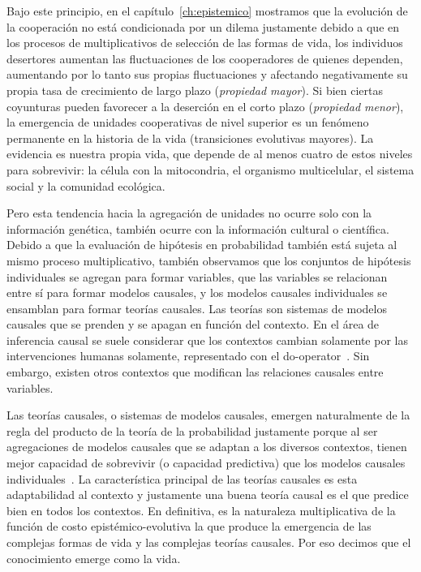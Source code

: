 \documentclass[a4paper,11pt]{book}
\theoremstyle{definition}
\begin{document}

Bajo este principio, en el cap\'itulo~\ref{ch:epistemico} mostramos que la evoluci\'on de la cooperaci\'on no est\'a condicionada por un dilema justamente debido a que en los procesos de multiplicativos de selecci\'on de las formas de vida, los individuos desertores aumentan las fluctuaciones de los cooperadores de quienes dependen, aumentando por lo tanto sus propias fluctuaciones y afectando negativamente su propia tasa de crecimiento de largo plazo (\emph{propiedad mayor}).
%
Si bien ciertas coyunturas pueden favorecer a la deserci\'on en el corto plazo (\emph{propiedad menor}), la emergencia de unidades cooperativas de nivel superior es un fen\'omeno permanente en la historia de la vida (transiciones evolutivas mayores).
%
La evidencia es nuestra propia vida, que depende de al menos cuatro de estos niveles para sobrevivir: la c\'elula con la mitocondria, el organismo multicelular, el sistema social y la comunidad ecol\'ogica.


Pero esta tendencia hacia la agregaci\'on de unidades no ocurre solo con la informaci\'on gen\'etica, tambi\'en ocurre con la informaci\'on cultural o cient\'ifica.
%
Debido a que la evaluaci\'on de hip\'otesis en probabilidad tambi\'en est\'a sujeta al mismo proceso multiplicativo, tambi\'en observamos que los conjuntos de hip\'otesis individuales se agregan para formar variables, que las variables se relacionan entre s\'i para formar modelos causales, y los modelos causales individuales se ensamblan para formar teor\'ias causales.
%
Las teor\'ias son sistemas de modelos causales que se prenden y se apagan en funci\'on del contexto.
%
En el \'area de inferencia causal se suele considerar que los contextos cambian solamente por las intervenciones humanas solamente, representado con el do-operator~\cite{pearl2009-causality}.
%
Sin embargo, existen otros contextos que modifican las relaciones causales entre variables.


Las teor\'ias causales, o sistemas de modelos causales, emergen naturalmente de la regla del producto de la teor\'ia de la probabilidad justamente porque al ser agregaciones de modelos causales que se adaptan a los diversos contextos, tienen mejor capacidad de sobrevivir (o capacidad predictiva) que los modelos causales individuales~\cite{winn2012-causality,minka2008-gates}.
%
La caracter\'istica principal de las teor\'ias causales es esta adaptabilidad al contexto y justamente una buena teor\'ia causal es el que predice bien en todos los contextos.
%
En definitiva, es la naturaleza multiplicativa de la funci\'on de costo epist\'emico-evolutiva la que produce la emergencia de las complejas formas de vida y las complejas teor\'ias causales.
%
Por eso decimos que el conocimiento emerge como la vida.
\end{document}
